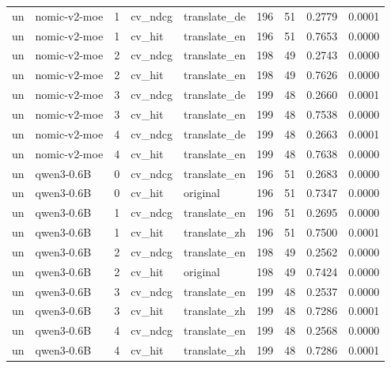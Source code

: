 \begin{tabular}{llrllrrrr}
un & nomic-v2-moe & 1 & cv\_ndcg & translate\_de & 196 & 51 & 0.2779 & 0.0001 \\
un & nomic-v2-moe & 1 & cv\_hit & translate\_en & 196 & 51 & 0.7653 & 0.0000 \\
un & nomic-v2-moe & 2 & cv\_ndcg & translate\_en & 198 & 49 & 0.2743 & 0.0000 \\
un & nomic-v2-moe & 2 & cv\_hit & translate\_en & 198 & 49 & 0.7626 & 0.0000 \\
un & nomic-v2-moe & 3 & cv\_ndcg & translate\_de & 199 & 48 & 0.2660 & 0.0001 \\
un & nomic-v2-moe & 3 & cv\_hit & translate\_en & 199 & 48 & 0.7538 & 0.0000 \\
un & nomic-v2-moe & 4 & cv\_ndcg & translate\_de & 199 & 48 & 0.2663 & 0.0001 \\
un & nomic-v2-moe & 4 & cv\_hit & translate\_en & 199 & 48 & 0.7638 & 0.0000 \\
un & qwen3-0.6B & 0 & cv\_ndcg & translate\_en & 196 & 51 & 0.2683 & 0.0000 \\
un & qwen3-0.6B & 0 & cv\_hit & original & 196 & 51 & 0.7347 & 0.0000 \\
un & qwen3-0.6B & 1 & cv\_ndcg & translate\_en & 196 & 51 & 0.2695 & 0.0000 \\
un & qwen3-0.6B & 1 & cv\_hit & translate\_zh & 196 & 51 & 0.7500 & 0.0001 \\
un & qwen3-0.6B & 2 & cv\_ndcg & translate\_en & 198 & 49 & 0.2562 & 0.0000 \\
un & qwen3-0.6B & 2 & cv\_hit & original & 198 & 49 & 0.7424 & 0.0000 \\
un & qwen3-0.6B & 3 & cv\_ndcg & translate\_en & 199 & 48 & 0.2537 & 0.0000 \\
un & qwen3-0.6B & 3 & cv\_hit & translate\_zh & 199 & 48 & 0.7286 & 0.0001 \\
un & qwen3-0.6B & 4 & cv\_ndcg & translate\_en & 199 & 48 & 0.2568 & 0.0000 \\
un & qwen3-0.6B & 4 & cv\_hit & translate\_zh & 199 & 48 & 0.7286 & 0.0001 \\
\bottomrule
\end{tabular}
